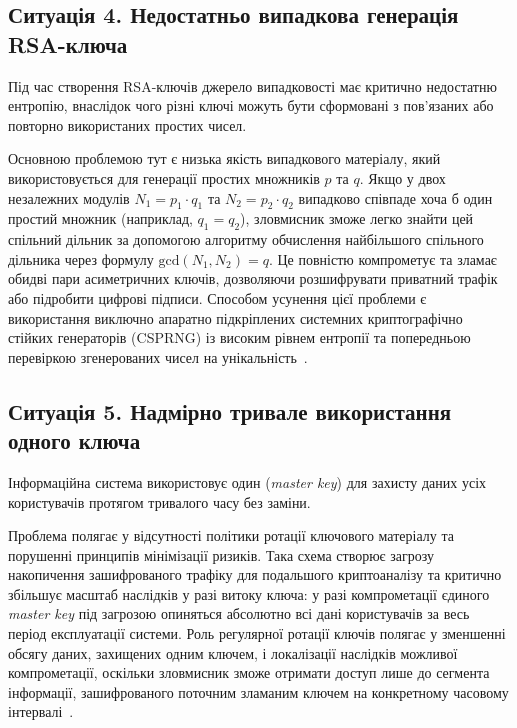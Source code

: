 \subsection{Ситуація 4. Недостатньо випадкова генерація RSA-ключа}

Під час створення RSA-ключів джерело випадковості має критично недостатню ентропію, внаслідок чого
різні ключі можуть бути сформовані з пов'язаних або повторно використаних простих чисел. 

Основною проблемою тут є низька якість випадкового матеріалу, який використовується 
для генерації простих множників $p$ та $q$. Якщо у двох незалежних модулів
$N_1 = p_1 \cdot q_1$ та $N_2 = p_2 \cdot q_2$ випадково співпаде хоча б один простий множник
(наприклад, $q_1 = q_2$), зловмисник зможе легко знайти цей спільний дільник за допомогою алгоритму
обчислення найбільшого спільного дільника через формулу $\text{gcd}(N_1, N_2) = q$. Це повністю
компрометує та зламає обидві пари асиметричних ключів, дозволяючи розшифрувати приватний трафік або
підробити цифрові підписи. Способом усунення цієї проблеми є використання виключно апаратно
підкріплених системних криптографічно стійких генераторів (CSPRNG) із високим рівнем ентропії та
попередньою перевіркою згенерованих чисел на унікальність~\cite{SP800-56B, RFC8017}.

\subsection{Ситуація 5. Надмірно тривале використання одного ключа}

Інформаційна система використовує один (\textit{master key}) для захисту даних усіх користувачів протягом
тривалого часу без заміни.

Проблема полягає у відсутності політики ротації ключового матеріалу та порушенні принципів мінімізації
ризиків. Така схема створює загрозу накопичення зашифрованого трафіку для подальшого криптоаналізу та
критично збільшує масштаб наслідків у разі витоку ключа: у разі компрометації єдиного \textit{master key} під
загрозою опиняться абсолютно всі дані користувачів за весь період експлуатації системи. Роль регулярної
ротації ключів полягає у зменшенні обсягу даних, захищених одним ключем, і локалізації наслідків можливої
компрометації, оскільки зловмисник зможе отримати доступ лише до сегмента інформації, зашифрованого
поточним зламаним ключем на конкретному часовому інтервалі~\cite{SP800-57}.
